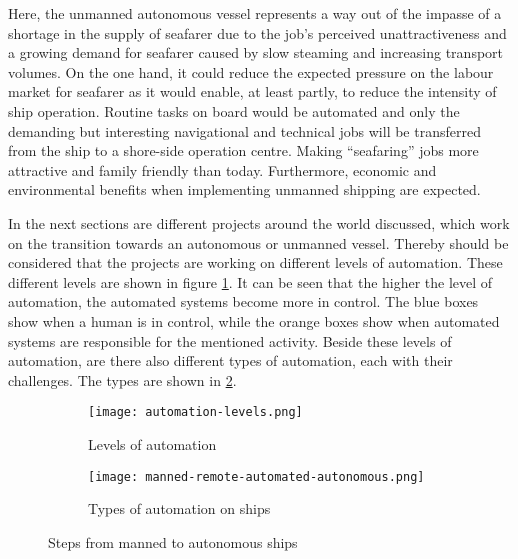 Here, the unmanned autonomous vessel represents a way out of the impasse of a shortage in the supply of seafarer due to the job’s perceived unattractiveness and a growing demand for seafarer caused by slow steaming and increasing transport volumes. On the one hand, it could reduce the expected pressure on the labour market for seafarer as it would enable, at least partly, to reduce the intensity of ship operation. Routine tasks on board would be automated and only the demanding but interesting navigational and technical jobs will be transferred from the ship to a shore-side operation centre. Making “seafaring” jobs more attractive and family friendly than today. Furthermore, economic and environmental benefits when implementing unmanned shipping are expected. \cite{MUNIN2016}

In the next sections are different projects around the world discussed, which work on the transition towards an autonomous or unmanned vessel. Thereby should be considered that the projects are working on different levels of automation. These different levels are shown in figure \ref{fig:automation-levels}. It can be seen that the higher the level of automation, the automated systems become more in control. The blue boxes show when a human is in control, while the orange boxes show when automated systems are responsible for the mentioned activity. 
Beside these levels of automation, are there also different types of automation, each with their challenges. The types are shown in \ref{fig:manned-remote-autonomous}.

\begin{figure}[hb]
	\begin{subfigure}[b]{0.55\linewidth}
		\centering
		\texttt{[image: automation-levels.png]}
		\caption{Levels of automation}
		\label{fig:automation-levels}
	\end{subfigure} 
	\begin{subfigure}[b]{0.4\linewidth}
		\centering
		\texttt{[image: manned-remote-automated-autonomous.png]}
		\caption{Types of automation on ships}
		\label{fig:manned-remote-autonomous}
	\end{subfigure}
	\caption{Steps from manned to autonomous ships}
	\label{fig:automation} 
\end{figure}


